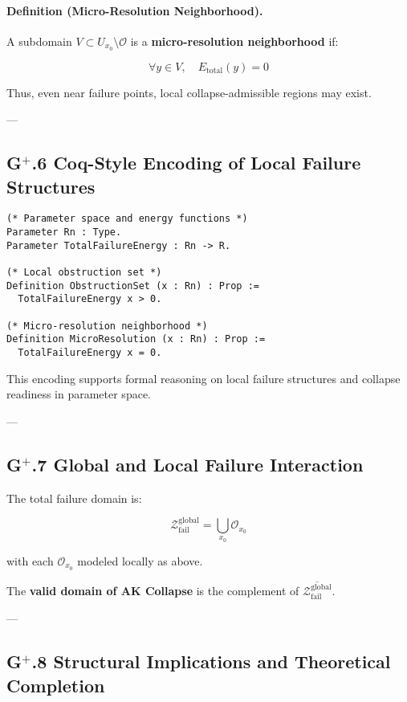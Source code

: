 \documentclass[11pt]{article}
\begin{document}
\paragraph{Definition (Micro-Resolution Neighborhood).}

A subdomain $V \subset U_{x_0} \setminus \mathcal{O}$ is a \textbf{micro-resolution neighborhood} if:

\[
\forall y \in V, \quad E_{\mathrm{total}}(y) = 0
\]

Thus, even near failure points, local collapse-admissible regions may exist.

---

\subsection*{G$^{+}$.6 Coq-Style Encoding of Local Failure Structures}

\begin{lstlisting}[language=Coq]
(* Parameter space and energy functions *)
Parameter Rn : Type.
Parameter TotalFailureEnergy : Rn -> R.

(* Local obstruction set *)
Definition ObstructionSet (x : Rn) : Prop :=
  TotalFailureEnergy x > 0.

(* Micro-resolution neighborhood *)
Definition MicroResolution (x : Rn) : Prop :=
  TotalFailureEnergy x = 0.
\end{lstlisting}

This encoding supports formal reasoning on local failure structures and collapse readiness in parameter space.

---

\subsection*{G$^{+}$.7 Global and Local Failure Interaction}

The total failure domain is:

\[
\mathcal{Z}_{\mathrm{fail}}^{\mathrm{global}} = \bigcup_{x_0} \mathcal{O}_{x_0}
\]

with each $\mathcal{O}_{x_0}$ modeled locally as above.

The \textbf{valid domain of AK Collapse} is the complement of $\overline{\mathcal{Z}_{\mathrm{fail}}^{\mathrm{global}}}$.

---

\subsection*{G$^{+}$.8 Structural Implications and Theoretical Completion}
\end{document}
